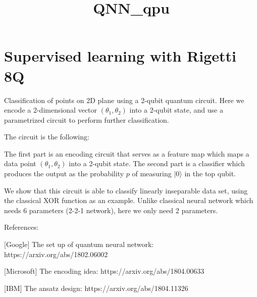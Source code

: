 \documentclass[11pt]{article}
\title{QNN\_qpu}
\begin{document}
    
    
    \maketitle
    
    

    
    \section{Supervised learning with Rigetti
8Q}\label{supervised-learning-with-rigetti-8q}

Classification of points on 2D plane using a 2-qubit quantum circuit.
Here we encode a 2-dimensional vector \((\theta_1, \theta_2)\) into a
2-qubit state, and use a parametrized circuit to perform further
classification.

The circuit is the following:

The first part is an encoding circuit that serves as a feature map which
maps a data point \((\theta_1,\theta_2)\) into a 2-qubit state. The
second part is a classifier which produces the output as the probability
\(p\) of measuring \(|0\rangle\) in the top qubit.

We show that this circuit is able to classify linearly inseparable data
set, using the classical XOR function as an example. Unlike classical
neural network which needs 6 parameters (2-2-1 network), here we only
need 2 parameters.

References:

{[}Google{]} The set up of quantum neural network:
https://arxiv.org/abs/1802.06002

{[}Microsoft{]} The encoding idea: https://arxiv.org/abs/1804.00633

{[}IBM{]} The ansatz design: https://arxiv.org/abs/1804.11326
\end{document}
